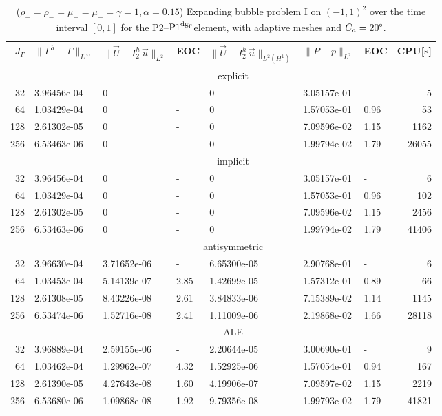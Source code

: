\documentclass[a4paper,12pt,onecolumn]{article}
\newcommand{\errorXx}{\|\Gamma^h - \Gamma\|_{L^\infty}}
\newcommand{\LerrorUu}[1]{\|\vec U - I^h_{#1}\,\vec u\|_{L^2}}
\newcommand{\HerrorUu}[1]{\|\vec U - I^h_{#1}\,\vec u\|_{L^2(H^1)}}
\newcommand{\LerrorPp}{\|P - p\|_{L^2}}
\newcommand{\pdg}{${\rm P1}^{{\rm dg}_\Gamma}$} %
\begin{document}
\begin{table}
\center
\hspace*{-3.25cm}
\begin{tabular}{rllllllr}
\hline
$J_\Gamma$ & $\errorXx$ & $\LerrorUu2$ & EOC & $\HerrorUu2$ & $\LerrorPp$ & EOC
& CPU[s] \\
\hline
& \multicolumn{7}{c}{explicit} \\
\hline
 32 & 3.96456e-04 & 0 & - & 0 & 3.05157e-01 &    - &     5 \\
 64 & 1.03429e-04 & 0 & - & 0 & 1.57053e-01 & 0.96 &    53 \\
128 & 2.61302e-05 & 0 & - & 0 & 7.09596e-02 & 1.15 &  1162 \\
256 & 6.53463e-06 & 0 & - & 0 & 1.99794e-02 & 1.79 & 26055 \\
\hline
& \multicolumn{7}{c}{implicit} \\
\hline
 32 & 3.96456e-04 & 0 & - & 0 & 3.05157e-01 &    - &     6 \\
 64 & 1.03429e-04 & 0 & - & 0 & 1.57053e-01 & 0.96 &   102 \\
128 & 2.61302e-05 & 0 & - & 0 & 7.09596e-02 & 1.15 &  2456 \\
256 & 6.53463e-06 & 0 & - & 0 & 1.99794e-02 & 1.79 & 41406 \\
\hline
& \multicolumn{7}{c}{antisymmetric} \\
\hline
 32 & 3.96630e-04 & 3.71652e-06 &    - & 6.65300e-05 & 2.90768e-01 &    - &
6 \\
 64 & 1.03453e-04 & 5.14139e-07 & 2.85 & 1.42699e-05 & 1.57312e-01 & 0.89 &
66 \\
128 & 2.61308e-05 & 8.43226e-08 & 2.61 & 3.84833e-06 & 7.15389e-02 & 1.14 &
1145 \\
256 & 6.53474e-06 & 1.52716e-08 & 2.41 & 1.11009e-06 & 2.19868e-02 & 1.66 &
28118 \\
\hline
& \multicolumn{7}{c}{ALE} \\
\hline
 32 & 3.96889e-04 & 2.59155e-06 &    - & 2.20644e-05 & 3.00690e-01 &    - &
9 \\
 64 & 1.03462e-04 & 1.29962e-07 & 4.32 & 1.52925e-06 & 1.57054e-01 & 0.94 &
167 \\
128 & 2.61390e-05 & 4.27643e-08 & 1.60 & 4.19906e-07 & 7.09597e-02 & 1.15 &
2219 \\
256 & 6.53680e-06 & 1.09868e-08 & 1.92 & 9.79356e-08 & 1.99793e-02 & 1.79 &
41821 \\
\hline
\end{tabular}
\hspace*{-3.25cm}
\caption[Navier--Stokes expanding bubble I errors P2--\pdg]
{($\rho_+ = \rho_- = \mu_+ = \mu_- = \gamma = 1,\alpha=0.15$)
Expanding bubble problem I on $(-1,1)^2$ over the time interval $[0,1]$ for the
P2--\pdg element, with adaptive meshes and $C_a=20\degree$.}
\label{tab:nsexpandingbubbleIp2p1dg}
\end{table}
\end{document}

